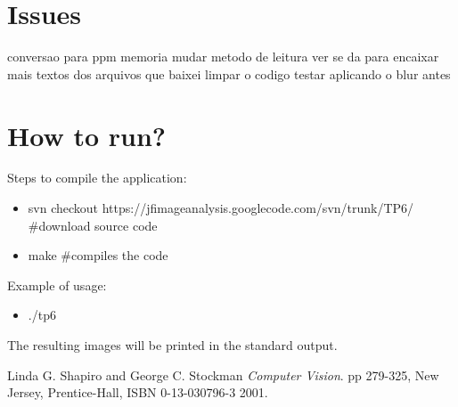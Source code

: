 \documentclass{article}
\begin{document}
\section{Issues}
	conversao para ppm
	memoria
	mudar metodo de leitura
	ver se da para encaixar mais textos dos arquivos que baixei
	limpar o codigo
	testar aplicando o blur antes



\section{How to run?}

	Steps to compile the application:
	
	\begin{itemize}
		\item svn checkout https://jfimageanalysis.googlecode.com/svn/trunk/TP6/ \#download source code
		\item make \#compiles the code
	\end{itemize}


	Example of usage:

	\begin{itemize}
		\item ./tp6
	\end{itemize}

	The resulting images will be printed in the standard output.


\begin{thebibliography}{9}

	Linda G. Shapiro and George C. Stockman
 	\emph{Computer Vision}.
	pp 279-325, 
	New Jersey, Prentice-Hall, 
	ISBN 0-13-030796-3
 	2001.

\end{thebibliography}
\end{document}
